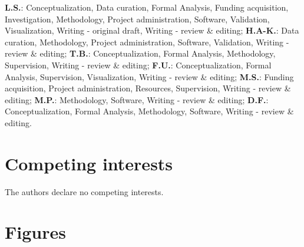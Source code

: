 \documentclass[5p,numafflabel]{elsarticle}
\begin{document}
\textbf{L.S.}:
Conceptualization,
Data curation,
Formal Analysis,
Funding acquisition,
Investigation,
Methodology,
Project administration,
Software,
Validation,
Visualization,
Writing - original draft,
Writing - review \& editing;
\textbf{H.A-K.}:
Data curation,
Methodology,
Project administration,
Software,
Validation,
Writing - review \& editing;
\textbf{T.B.}:
Conceptualization,
Formal Analysis,
Methodology,
Supervision,
Writing - review \& editing;
\textbf{F.U.}:
Conceptualization,
Formal Analysis,
Supervision,
Visualization,
Writing - review \& editing;
\textbf{M.S.}:
Funding acquisition,
Project administration,
Resources,
Supervision,
Writing - review \& editing;
\textbf{M.P.}:
Methodology,
Software,
Writing - review \& editing;
\textbf{D.F.}:
Conceptualization,
Formal Analysis,
Methodology,
Software,
Writing - review \& editing.


\section*{Competing interests}

The authors declare no competing interests.


\section*{Figures}
\end{document}
